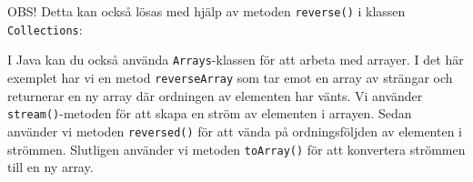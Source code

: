 \hypertarget{cb2}{}
\begin{Shaded}
\begin{Highlighting}[]
  \OperatorTok{[]} \OperatorTok{(}\OperatorTok{[]}\OperatorTok{)} \OperatorTok{\{}
    \OperatorTok{[]}\OperatorTok{=}  \OperatorTok{[}\OperatorTok{];}
    \OperatorTok{=} \OperatorTok{;}
     \OperatorTok{(}\OperatorTok{=} \OperatorTok{{-}} \OperatorTok{;}\OperatorTok{\textgreater{}=} \OperatorTok{;}\OperatorTok{{-}{-})} \OperatorTok{\{}
\OperatorTok{[}\OperatorTok{]} \OperatorTok{=}\OperatorTok{[}\OperatorTok{];}
\OperatorTok{++;}
    \OperatorTok{\}}
    \OperatorTok{;}
\OperatorTok{\}}
\end{Highlighting}
\end{Shaded}

OBS! Detta kan också lösas med hjälp av metoden \texttt{reverse()} i
klassen \texttt{Collections}:

\hypertarget{cb3}{}
\begin{Shaded}
\begin{Highlighting}[]
\OperatorTok{\textless{}}\OperatorTok{\textgreater{}}\OperatorTok{=} \OperatorTok{(}\OperatorTok{);}
\OperatorTok{(}\OperatorTok{);}
\OperatorTok{(} \OperatorTok{[}\OperatorTok{()]);}
\end{Highlighting}
\end{Shaded}

I Java kan du också använda \texttt{Arrays}-klassen för att arbeta med
arrayer. I det här exemplet har vi en metod \texttt{reverseArray} som
tar emot en array av strängar och returnerar en ny array där ordningen
av elementen har vänts. Vi använder \texttt{stream()}-metoden för att
skapa en ström av elementen i arrayen. Sedan använder vi metoden
\texttt{reversed()} för att vända på ordningsföljden av elementen i
strömmen. Slutligen använder vi metoden \texttt{toArray()} för att
konvertera strömmen till en ny array.

